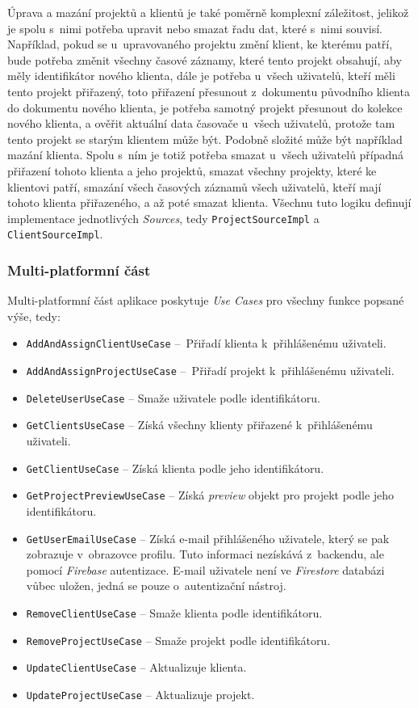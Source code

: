 Úprava a mazání projektů a klientů je také poměrně komplexní záležitost, jelikož je spolu s~nimi potřeba upravit nebo smazat řadu dat, které s~nimi souvisí. Například, pokud se u~upravovaného projektu změní klient, ke kterému patří, bude potřeba změnit všechny časové záznamy, které tento projekt obsahují, aby měly identifikátor nového klienta, dále je potřeba u~všech uživatelů, kteří měli tento projekt přiřazený, toto přiřazení přesunout z~dokumentu původního klienta do dokumentu nového klienta, je potřeba samotný projekt přesunout do kolekce nového klienta, a ověřit aktuální data časovače u~všech uživatelů, protože tam tento projekt se starým klientem může být. Podobně složité může být například mazání klienta. Spolu s~ním je totiž potřeba smazat u~všech uživatelů případná přiřazení tohoto klienta a jeho projektů, smazat všechny projekty, které ke klientovi patří, smazání všech časových záznamů všech uživatelů, kteří mají tohoto klienta přiřazeného, a až poté smazat klienta. Všechnu tuto logiku definují implementace jednotlivých \emph{Sources}, tedy \texttt{ProjectSourceImpl} a \texttt{ClientSourceImpl}.

\subsubsection{Multi-platformní část}

Multi-platformní část aplikace poskytuje \emph{Use Cases} pro všechny funkce popsané výše, tedy:
\begin{itemize}
\item\texttt{AddAndAssignClientUseCase} – Přiřadí klienta k~přihlášenému uživateli.
\item\texttt{AddAndAssignProjectUseCase} – Přiřadí projekt k~přihlášenému uživateli.
\item\texttt{DeleteUserUseCase} – Smaže uživatele podle identifikátoru.
\item\texttt{GetClientsUseCase} – Získá všechny klienty přiřazené k~přihlášenému uživateli.
\item\texttt{GetClientUseCase} – Získá klienta podle jeho identifikátoru.
\item\texttt{GetProjectPreviewUseCase} – Získá \emph{preview} objekt pro projekt podle jeho identifikátoru.
\item\texttt{GetUserEmailUseCase} – Získá e-mail přihlášeného uživatele, který se pak zobrazuje v~obrazovce profilu. Tuto informaci nezískává z~backendu, ale pomocí \emph{Firebase} autentizace. E-mail uživatele není ve \emph{Firestore} databázi vůbec uložen, jedná se pouze o~autentizační nástroj.
\item\texttt{RemoveClientUseCase} – Smaže klienta podle identifikátoru.
\item\texttt{RemoveProjectUseCase} – Smaže projekt podle identifikátoru.
\item\texttt{UpdateClientUseCase} – Aktualizuje klienta.
\item\texttt{UpdateProjectUseCase} – Aktualizuje projekt.
\end{itemize}

